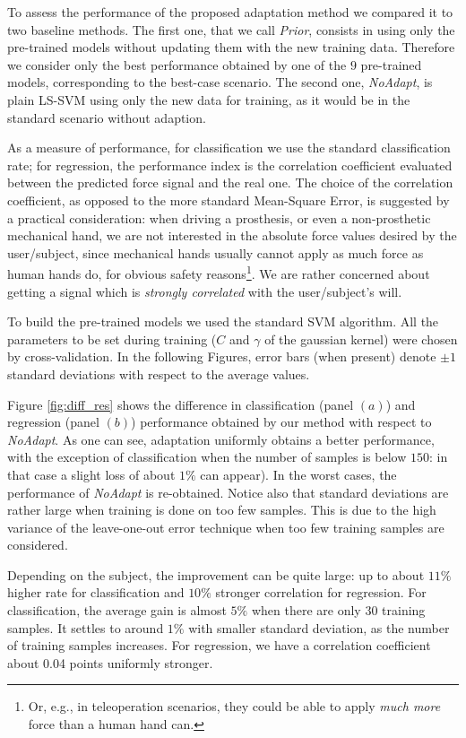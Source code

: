 To assess the performance of the proposed adaptation method we
compared it to two baseline methods. The first one, that we call
\emph{Prior}, consists in using only the pre-trained models without
updating them with the new training data. Therefore we consider only the
best performance obtained by one of the $9$ pre-trained models, corresponding to the
best-case scenario. The second one, \emph{NoAdapt}, is plain LS-SVM
using only the new data for training, as it would be in the standard
scenario without adaption.

As a measure of performance, for classification we use the standard
classification rate; for regression, the performance index is the
correlation coefficient evaluated between the predicted force signal
and the real one. The choice of the correlation coefficient, as
opposed to the more standard Mean-Square Error, is suggested by a
practical consideration: when driving a prosthesis, or even a
non-prosthetic mechanical hand, we are not interested in the absolute
force values desired by the user/subject, since mechanical hands
usually cannot apply as much force as human hands do, for obvious
safety reasons\footnote{Or, e.g., in teleoperation scenarios, they
could be able to apply \emph{much more} force than a human hand
can.}. We are rather concerned about getting a signal which is
\emph{strongly correlated} with the user/subject's will.

To build the pre-trained models we used the standard SVM
algorithm. All the parameters to be set during training ($C$ and
$\gamma$ of the gaussian kernel) were chosen by cross-validation. In
the following Figures, error bars (when present) denote $\pm 1$
standard deviations with respect to the average values.

Figure \ref{fig:diff_res} shows the difference in classification
(panel $(a)$) and regression (panel $(b)$) performance obtained by our
method with respect to \emph{NoAdapt}. As one can see, adaptation
uniformly obtains a better performance, with the exception of
classification when the number of samples is below $150$: in that case a
slight loss of about $1\%$ can appear).  In the worst cases, the
performance of \emph{NoAdapt} is re-obtained. Notice also that
standard deviations are rather large when training is done on too few
samples. This is due to the high variance of the leave-one-out error
technique when too few training samples are considered.

Depending on the subject, the improvement can be quite large: up to
about $11\%$ higher rate for classification and $10\%$ stronger
correlation for regression. For classification, the average gain is
almost $5\%$ when there are only $30$ training samples. It settles
to around $1\%$ with smaller standard deviation, as the number of
training samples increases. For regression, we have a correlation coefficient about 0.04 points uniformly stronger.

